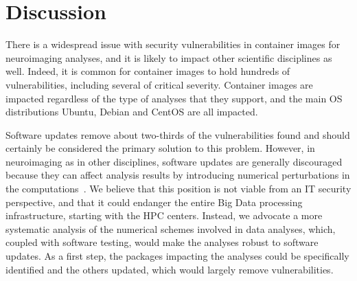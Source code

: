 \documentclass[a4paper,num-refs]{oup-contemporary}
\begin{document}






\section{Discussion}

There is a widespread issue with security vulnerabilities in container
images for neuroimaging analyses, and it is likely to impact other
scientific disciplines as well. Indeed, it is common for container images
to hold hundreds of vulnerabilities, including several of critical
severity. Container images are impacted regardless of the type of analyses
that they support, and the main OS distributions Ubuntu, Debian and CentOS
are all impacted.

Software updates remove about two-thirds of the vulnerabilities found and
should certainly be considered the primary solution to this problem.
However, in neuroimaging as in other disciplines, software updates are
generally discouraged because they can affect analysis results by
introducing numerical perturbations in the
computations~\cite{gronenschild2012effects,glatard2015reproducibility}. We
believe that this position is not viable from an IT security perspective,
and that it could endanger the entire Big Data processing infrastructure,
starting with the HPC centers. Instead, we advocate a more systematic
analysis of the numerical schemes involved in data analyses, which, coupled
with software testing, would make the analyses robust to software updates.
As a first step, the packages impacting the analyses could be specifically
identified and the others updated, which would largely remove
vulnerabilities.
\end{document}

